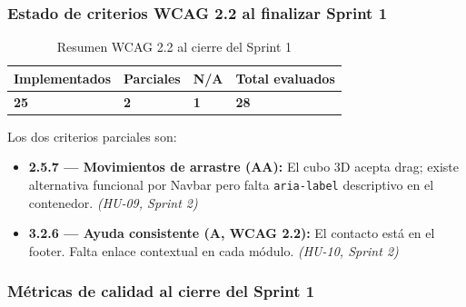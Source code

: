 \documentclass[12pt, a4paper]{article}
\begin{document}
\subsubsection{Estado de criterios WCAG 2.2 al finalizar Sprint 1}

\begin{table}[H]
\centering
\caption{Resumen WCAG 2.2 al cierre del Sprint 1}
\small
\begin{tabular}{@{}>{\centering\arraybackslash}p{2.5cm} >{\centering\arraybackslash}p{2.5cm} >{\centering\arraybackslash}p{2.5cm} >{\centering\arraybackslash}p{2.5cm}@{}}
\toprule
\rowcolor{graylight}
\textbf{Implementados} & \textbf{Parciales} & \textbf{N/A} & \textbf{Total evaluados} \\
\midrule
\textcolor{successgreen}{\textbf{25}} &
\textcolor{warningyellow}{\textbf{2}} &
\textcolor{graymid}{\textbf{1}} &
\textbf{28} \\
\bottomrule
\end{tabular}
\end{table}

Los dos criterios parciales son:
\begin{itemize}
  \item \textbf{2.5.7 --- Movimientos de arrastre (AA):} El cubo 3D acepta drag; existe alternativa funcional por Navbar pero falta \texttt{aria-label} descriptivo en el contenedor. \textit{(HU-09, Sprint 2)}
  \item \textbf{3.2.6 --- Ayuda consistente (A, WCAG 2.2):} El contacto está en el footer. Falta enlace contextual en cada módulo. \textit{(HU-10, Sprint 2)}
\end{itemize}

\subsubsection{Métricas de calidad al cierre del Sprint 1}
\end{document}
